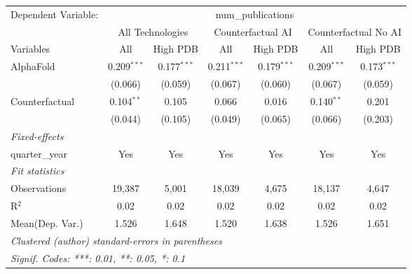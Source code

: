 \begingroup
\centering
\begin{tabular}{lcccccc}
   \tabularnewline \midrule \midrule
   Dependent Variable: & \multicolumn{6}{c}{num\_publications}\\
 & \multicolumn{2}{c}{All Technologies} & \multicolumn{2}{c}{Counterfactual AI} & \multicolumn{2}{c}{Counterfactual No AI} \\
\cmidrule(lr){1-1}\cmidrule(lr){2-3} \cmidrule(lr){4-5} \cmidrule(lr){6-7}
Variables & \multicolumn{1}{c}{All} & \multicolumn{1}{c}{High PDB} & \multicolumn{1}{c}{All} & \multicolumn{1}{c}{High PDB} & \multicolumn{1}{c}{All} & \multicolumn{1}{c}{High PDB} \\
\cmidrule(lr){1-1}\cmidrule(lr){2-2} \cmidrule(lr){3-3} \cmidrule(lr){4-4} \cmidrule(lr){5-5} \cmidrule(lr){6-6} \cmidrule(lr){7-7}
   AlphaFold      & 0.209$^{***}$ & 0.177$^{***}$ & 0.211$^{***}$ & 0.179$^{***}$ & 0.209$^{***}$ & 0.173$^{***}$\\   
                  & (0.066)       & (0.059)       & (0.067)       & (0.060)       & (0.067)       & (0.059)\\   
   Counterfactual & 0.104$^{**}$  & 0.105         & 0.066         & 0.016         & 0.140$^{**}$  & 0.201\\   
                  & (0.044)       & (0.105)       & (0.049)       & (0.065)       & (0.066)       & (0.203)\\   
   \midrule
   \emph{Fixed-effects}\\
   quarter\_year  & Yes           & Yes           & Yes           & Yes           & Yes           & Yes\\  
   \midrule
   \emph{Fit statistics}\\
   Observations   & 19,387        & 5,001         & 18,039        & 4,675         & 18,137        & 4,647\\  
   R$^2$          & 0.02          & 0.02          & 0.02          & 0.02          & 0.02          & 0.02\\  
Mean(Dep. Var.) & 1.526 & 1.648 & 1.520 & 1.638 & 1.526 & 1.651 \\
   \midrule \midrule
   \multicolumn{7}{l}{\emph{Clustered (author) standard-errors in parentheses}}\\
   \multicolumn{7}{l}{\emph{Signif. Codes: ***: 0.01, **: 0.05, *: 0.1}}\\
\end{tabular}
\par\endgroup
